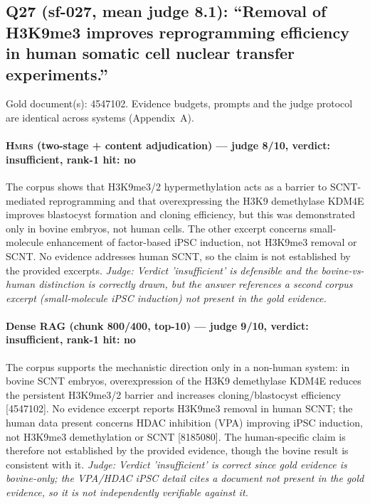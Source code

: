 \documentclass[sigconf, review, anonymous]{acmart}
\begin{document}
\subsection{Q27 (sf-027, mean judge 8.1): ``Removal of H3K9me3 improves reprogramming efficiency in human somatic cell nuclear transfer experiments.''}
\label{app:q27}
\noindent Gold document(s): 4547102. Evidence budgets, prompts and the judge protocol are identical across systems (Appendix~A).
\paragraph{\textbf{\textsc{Hmrs}} (two-stage + content adjudication) --- judge 8/10, verdict: insufficient, rank-1 hit: no}
\noindent The corpus shows that H3K9me3/2 hypermethylation acts as a barrier to SCNT-mediated reprogramming and that overexpressing the H3K9 demethylase KDM4E improves blastocyst formation and cloning efficiency, but this was demonstrated only in bovine embryos, not human cells. The other excerpt concerns small-molecule enhancement of factor-based iPSC induction, not H3K9me3 removal or SCNT. No evidence addresses human SCNT, so the claim is not established by the provided excerpts.
\noindent\small\textit{Judge: Verdict 'insufficient' is defensible and the bovine-vs-human distinction is correctly drawn, but the answer references a second corpus excerpt (small-molecule iPSC induction) not present in the gold evidence.}
\paragraph{Dense RAG (chunk 800/400, top-10) --- judge 9/10, verdict: insufficient, rank-1 hit: no}
\noindent The corpus supports the mechanistic direction only in a non-human system: in bovine SCNT embryos, overexpression of the H3K9 demethylase KDM4E reduces the persistent H3K9me3/2 barrier and increases cloning/blastocyst efficiency [4547102]. No evidence excerpt reports H3K9me3 removal in human SCNT; the human data present concerns HDAC inhibition (VPA) improving iPSC induction, not H3K9me3 demethylation or SCNT [8185080]. The human-specific claim is therefore not established by the provided evidence, though the bovine result is consistent with it.
\noindent\small\textit{Judge: Verdict 'insufficient' is correct since gold evidence is bovine-only; the VPA/HDAC iPSC detail cites a document not present in the gold evidence, so it is not independently verifiable against it.}
\end{document}
